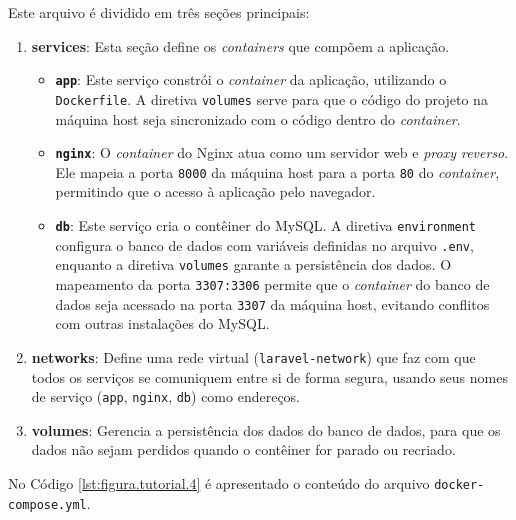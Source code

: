         \par Este arquivo é dividido em três seções principais:

        \begin{enumerate}
            \item \textbf{services}: Esta seção define os \textit{containers} que compõem a aplicação.
            \begin{itemize}
                \item \textbf{\texttt{app}}: Este serviço constrói o \textit{container} da aplicação, utilizando o \texttt{Dockerfile}. A diretiva \texttt{volumes} serve para que o código do projeto na máquina host seja sincronizado com o código dentro do \textit{container}.
                
                \item \textbf{\texttt{nginx}}: O \textit{container} do Nginx atua como um servidor web e \textit{proxy reverso}. Ele mapeia a porta \texttt{8000} da máquina host para a porta \texttt{80} do \textit{container}, permitindo que o acesso à aplicação pelo navegador.
                
                \item \textbf{\texttt{db}}: Este serviço cria o contêiner do MySQL. A diretiva \texttt{environment} configura o banco de dados com variáveis definidas no arquivo \texttt{.env}, enquanto a diretiva \texttt{volumes} garante a persistência dos dados. O mapeamento da porta \texttt{3307:3306} permite que o \textit{container} do banco de dados seja acessado na porta \texttt{3307} da máquina host, evitando conflitos com outras instalações do MySQL.
            \end{itemize}
        
            \item \textbf{networks}: Define uma rede virtual (\texttt{laravel-network}) que faz com que todos os serviços se comuniquem entre si de forma segura, usando seus nomes de serviço (\texttt{app}, \texttt{nginx}, \texttt{db}) como endereços.
        
            \item \textbf{volumes}: Gerencia a persistência dos dados do banco de dados, para que os dados não sejam perdidos quando o contêiner for parado ou recriado.
        \end{enumerate}
    
        \par No Código \ref{lst:figura.tutorial.4} é apresentado o conteúdo do arquivo \texttt{docker-compose.yml}.

